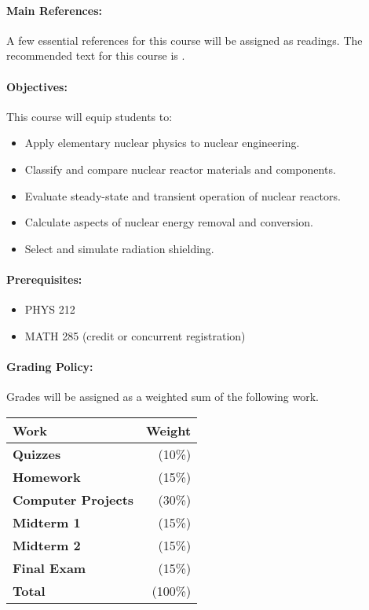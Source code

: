 \documentclass[11pt, a4paper]{article}
\begin{document}
\paragraph{Main References:}
A few essential references for this course will be assigned as readings. The 
recommended text for this course is \cite{rec_text}.

\renewcommand{\refname}{\normalfont\selectfont\normalsize}\vspace{-1cm} 


\paragraph{Objectives:} 

This course will equip students to:

\begin{itemize}
\item Apply elementary nuclear physics to nuclear engineering. 
\item Classify and compare nuclear reactor materials and components.
\item Evaluate steady-state and transient operation of nuclear reactors.
\item Calculate aspects of nuclear energy removal and conversion.
\item Select and simulate radiation shielding.
\end{itemize}

\paragraph{Prerequisites:} 
\begin{itemize}
\item PHYS 212
\item MATH 285 (credit or concurrent registration)
\end{itemize}

\paragraph{Grading Policy:} Grades will be assigned as a weighted sum of the following work. 

\begin{table}[h]
\begin{tabularx}{\textwidth}{Xr}
\textbf{Work} & \textbf{Weight}\\
\hline
\textbf{Quizzes} & (10\%) \\
\textbf{Homework} & (15\%) \\
\textbf{Computer Projects} & (30\%) \\
\textbf{Midterm 1} & (15\%) \\
\textbf{Midterm 2} & (15\%) \\
\textbf{Final Exam} & (15\%) \\
\hline
\textbf{Total} & (100\%) \\
\end{tabularx}
\end{table}
\end{document}
